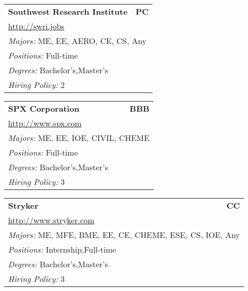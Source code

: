 \documentclass[twoside]{article}
\begin{document}
\begin{center}
\begin{multicols}{3}
\begin{FlushLeft}
\begin{minipage}{\columnwidth}
\end{minipage}
 
\begin{minipage}{\columnwidth}\begin{tabularx}{.95\columnwidth}{Xr}
                 {\Large\bf Southwest Research Institute} & {\Large\bf PC}\\
    \multicolumn{2}{p{.95\columnwidth}}{\url{http://swri.jobs}}\\
    \multicolumn{2}{p{.95\columnwidth}}{\emph{Majors:} ME, EE, AERO, CE, CS, Any}\\
    \multicolumn{2}{p{.95\columnwidth}}{\emph{Positions:} Full-time}\\
    \multicolumn{2}{p{.95\columnwidth}}{\emph{Degrees:} Bachelor's,Master's}\\
    \multicolumn{2}{p{.95\columnwidth}}{\emph{Hiring Policy:} 2}\\
    \end{tabularx}
    
\end{minipage}
 
\begin{minipage}{\columnwidth}\begin{tabularx}{.95\columnwidth}{Xr}
                 {\Large\bf SPX Corporation} & {\Large\bf BBB}\\
    \multicolumn{2}{p{.95\columnwidth}}{\url{http://www.spx.com}}\\
    \multicolumn{2}{p{.95\columnwidth}}{\emph{Majors:} ME, EE, IOE, CIVIL, CHEME}\\
    \multicolumn{2}{p{.95\columnwidth}}{\emph{Positions:} Full-time}\\
    \multicolumn{2}{p{.95\columnwidth}}{\emph{Degrees:} Bachelor's,Master's}\\
    \multicolumn{2}{p{.95\columnwidth}}{\emph{Hiring Policy:} 3}\\
    \end{tabularx}
    
\end{minipage}
 
\begin{minipage}{\columnwidth}\begin{tabularx}{.95\columnwidth}{Xr}
                 {\Large\bf Stryker} & {\Large\bf CC}\\
    \multicolumn{2}{p{.95\columnwidth}}{\url{http://www.stryker.com}}\\
    \multicolumn{2}{p{.95\columnwidth}}{\emph{Majors:} ME, MFE, BME, EE, CE, CHEME, ESE, CS, IOE, Any}\\
    \multicolumn{2}{p{.95\columnwidth}}{\emph{Positions:} Internship,Full-time}\\
    \multicolumn{2}{p{.95\columnwidth}}{\emph{Degrees:} Bachelor's,Master's}\\
    \multicolumn{2}{p{.95\columnwidth}}{\emph{Hiring Policy:} 3}\\
    \end{tabularx}
    

\end{minipage}
\end{FlushLeft}
\end{multicols}
\end{center}
\end{document}
